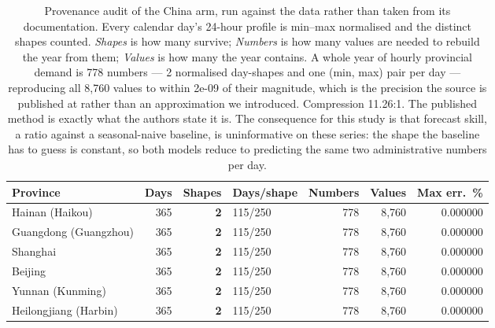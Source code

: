 \begin{table}[t]
\centering
\small
\begin{tabular}{lrrlrrr}
\toprule
Province & Days & Shapes & Days/shape & Numbers & Values & Max err.\ \% \\
\midrule
Hainan (Haikou) & 365 & \textbf{2} & 115/250 & 778 & 8,760 & 0.000000 \\
Guangdong (Guangzhou) & 365 & \textbf{2} & 115/250 & 778 & 8,760 & 0.000000 \\
Shanghai & 365 & \textbf{2} & 115/250 & 778 & 8,760 & 0.000000 \\
Beijing & 365 & \textbf{2} & 115/250 & 778 & 8,760 & 0.000000 \\
Yunnan (Kunming) & 365 & \textbf{2} & 115/250 & 778 & 8,760 & 0.000000 \\
Heilongjiang (Harbin) & 365 & \textbf{2} & 115/250 & 778 & 8,760 & 0.000000 \\
\bottomrule
\end{tabular}
\caption{Provenance audit of the China arm, run against the data rather than taken from its documentation. Every calendar day's 24-hour profile is min--max normalised and the distinct shapes counted. \emph{Shapes} is how many survive; \emph{Numbers} is how many values are needed to rebuild the year from them; \emph{Values} is how many the year contains. A whole year of hourly provincial demand is 778 numbers --- 2 normalised day-shapes and one (min, max) pair per day --- reproducing all 8,760 values to within 2e-09 of their magnitude, which is the precision the source is published at rather than an approximation we introduced. Compression 11.26:1. The published method is exactly what the authors state it is. The consequence for this study is that forecast skill, a ratio against a seasonal-naive baseline, is uninformative on these series: the shape the baseline has to guess is constant, so both models reduce to predicting the same two administrative numbers per day.}
\label{tab:china-audit}
\end{table}

